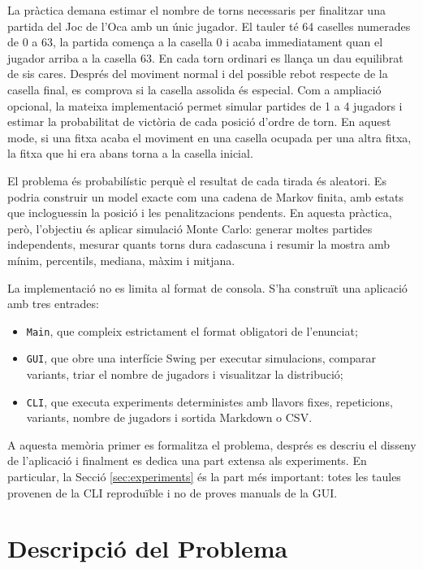 \documentclass[conference,compsoc]{IEEEtran}
\begin{document}
La pràctica demana estimar el nombre de torns necessaris per finalitzar una
partida del Joc de l'Oca amb un únic jugador. El tauler té 64 caselles numerades
de 0 a 63, la partida comença a la casella 0 i acaba immediatament quan el jugador
arriba a la casella 63. En cada torn ordinari es llança un dau equilibrat de sis
cares. Després del moviment normal i del possible rebot respecte de la casella
final, es comprova si la casella assolida és especial. Com a ampliació opcional,
la mateixa implementació permet simular partides de 1 a 4 jugadors i estimar la
probabilitat de victòria de cada posició d'ordre de torn. En aquest mode, si una
fitxa acaba el moviment en una casella ocupada per una altra fitxa, la fitxa que hi
era abans torna a la casella inicial.

El problema és probabilístic perquè el resultat de cada tirada és aleatori. Es
podria construir un model exacte com una cadena de Markov finita, amb estats que
incloguessin la posició i les penalitzacions pendents. En aquesta pràctica, però,
l'objectiu és aplicar simulació Monte Carlo: generar moltes partides independents,
mesurar quants torns dura cadascuna i resumir la mostra amb mínim, percentils,
mediana, màxim i mitjana.

La implementació no es limita al format de consola. S'ha construït una aplicació
amb tres entrades:
\begin{itemize}
    \item \texttt{Main}, que compleix estrictament el format obligatori de
    l'enunciat;
    \item \texttt{GUI}, que obre una interfície Swing per executar simulacions,
    comparar variants, triar el nombre de jugadors i visualitzar la distribució;
    \item \texttt{CLI}, que executa experiments deterministes amb llavors fixes,
    repeticions, variants, nombre de jugadors i sortida Markdown o CSV.
\end{itemize}

A aquesta memòria primer es
formalitza el problema, després es descriu el disseny de l'aplicació i finalment
es dedica una part extensa als experiments. En particular, la Secció
\ref{sec:experiments} és la part més important: totes les taules provenen de la
CLI reproduïble i no de proves manuals de la GUI.

\section{Descripció del Problema}
\end{document}
